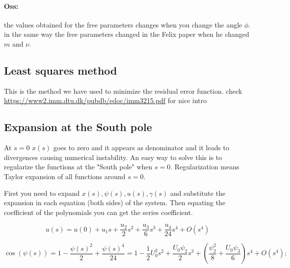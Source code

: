 \documentclass[12pt]{article}
\begin{document}
\paragraph{Oss:} the values obtained for the free parameters changes when you change the angle $\phi$. in the same way the free parameters changed in the Felix paper when he changed $m$ and $\nu$.


\subsection{Least squares method}
This is the method we have used to minimize the residual error function. check \url{https://www2.imm.dtu.dk/pubdb/edoc/imm3215.pdf} for nice intro


\subsection{Expansion at the South pole}

At $s=0$ $x(s)$ goes to zero and it appears as denominator and it leads to divergences causing numerical instability. An easy way to solve this is to regularize the functions at the "South pole" when $s=0$. Regularization means Taylor expansion of all functions around $s=0$.


First you need to expand $x(s),\psi(s),u(s),\gamma(s)$ and substitute the expansion in each equation (both sides) of the system. Then equating the coefficient of the polynomials you can get the series coefficient.

$$
u(s)=u(0) + u_1s + \frac{u_2 }{2}s^2 + \frac{u_3 }{6}s^3 + \frac{u_4 }{24}s^4 + O(s^4)
$$


$$
\cos(\psi(s))= 1 - \frac{\psi(s)^2}{2} + \frac{\psi(s)^4}{24} = 1 - \frac{1}{2} U_0^2 s^2 + \frac{U_0 \psi_2}{2} s^3 + (\frac{\psi_2^2}{8} + \frac{U_0 \psi_3}{6}) s^4 +O(s^4);
$$







\end{document}
